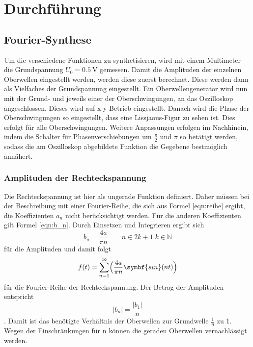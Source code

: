 \section{Durchführung}

\subsection{Fourier-Synthese}
Um die verschiedene Funktionen zu synthetisieren, wird mit einem Multimeter die Grundspannung $U_0=\qty{0.5}{\volt}$ gemessen.
Damit die Amplituden der einzelnen Oberwellen eingestellt werden, werden diese zuerst berechnet.
Diese werden dann als Vielfaches der Grundspannung eingestellt.
Ein Oberwellengenerator wird nun mit der Grund- und jeweils einer der Oberschwingungen, an das Oszilloskop angeschlossen.
Dieses wird auf x-y Betrieb eingestellt.
Danach wird die Phase der Oberschwingungen so eingestellt, dass eine Lissjaous-Figur zu sehen ist.
Dies erfolgt für alle Oberschwingungen.
Weitere Anpassungen erfolgen im Nachhinein, indem die Schalter für Phasenverschiebungen um $\frac{\pi}{2}$ und $\pi$ so betätigt werden, sodass die am Oszilloskop abgebildete Funktion die Gegebene bestmöglich annähert.

\label{sec:Durchführung}
\subsubsection{Amplituden der Rechteckspannung}
Die Rechteckspannung ist hier als ungerade Funktion definiert.
Daher müssen bei der Beschreibung mit einer Fourier-Reihe, die sich aus Formel \ref{eqn:reihe} ergibt, die Koeffizienten $a_n$ nicht berücksichtigt werden.
Für die anderen Koeffizienten gilt Formel \ref{eqn:b_n}.
Durch Einsetzen und Integrieren ergibt sich 
\begin{equation*}
    b_n=\frac{4a}{\pi n} \qquad n\in2k+1 \; k\in\mathbb{N}
    \label{eqn:amp_recht}
\end{equation*}
für die Amplituden und damit folgt
\begin{equation*}
    f(t)=\sum_{n=1}^{\infty}\Bigl( \frac{4a}{\pi n} \symbf{sin}(n t)\Bigr) 
    \label{eqn:recht}
\end{equation*}
für die Fourier-Reihe der Rechteckspannung.
Der Betrag der Amplituden entspricht
\begin{equation}
    |b_n|=\frac{|b_1|}{n}
    \label{eqn:b_recht}
\end{equation}.
Damit ist das benötigte Verhältnis der Oberwellen zur Grundwelle $\frac{1}{n}$ zu 1.
Wegen der Einschränkungen für n können die geraden Oberwellen vernachlässigt werden.

